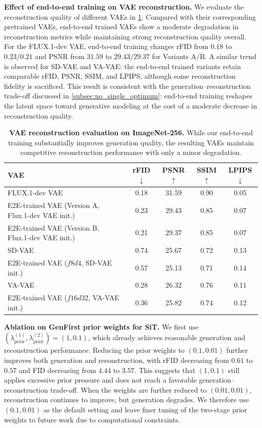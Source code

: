 \textbf{Effect of end-to-end training on VAE reconstruction.}
We evaluate the reconstruction quality of different VAEs in \cref{tab:vae_reconstruction}.
Compared with their corresponding pretrained VAEs, end-to-end trained VAEs show a moderate degradation in reconstruction metrics while maintaining strong reconstruction quality overall.
For the FLUX.1-dev VAE, end-to-end training changes rFID from $0.18$ to $0.23/0.21$ and PSNR from $31.59$ to $29.43/29.37$ for Variants A/B.
A similar trend is observed for SD-VAE and VA-VAE: the end-to-end trained variants retain comparable rFID, PSNR, SSIM, and LPIPS, although some reconstruction fidelity is sacrificed.
This result is consistent with the generation--reconstruction trade-off discussed in \cref{subsec:no_single_optimum}: end-to-end training reshapes the latent space toward generative modeling at the cost of a moderate decrease in reconstruction quality.

\begin{table}[t]
\centering
\scriptsize
\caption{
\textbf{VAE reconstruction evaluation on ImageNet-256.}
While our end-to-end training substantially improves generation quality, the resulting VAEs maintain competitive reconstruction performance with only a minor degradation.
}
\label{tab:vae_reconstruction}
\setlength{\tabcolsep}{5.0pt}

\begin{tabular}{lcccc}
\toprule
VAE
& rFID$\downarrow$
& PSNR$\uparrow$
& SSIM$\uparrow$
& LPIPS$\downarrow$ \\
\midrule
FLUX.1-dev VAE~\cite{flux1}
& 0.18
& 31.59
& 0.90
& 0.05 \\
E2E-trained VAE (Version A, Flux.1-dev VAE init.)
& 0.23
& 29.43
& 0.85
& 0.07 \\
E2E-trained VAE (Version B, Flux.1-dev VAE init.)
& 0.21
& 29.37
& 0.85
& 0.07 \\
\midrule
SD-VAE~\cite{ldm}
& 0.74
& 25.67
& 0.72
& 0.13 \\
E2E-trained VAE ($f8d4$, SD-VAE init.)
& 0.57
& 25.13
& 0.71
& 0.14 \\
\midrule
VA-VAE~\cite{vavae}
& 0.28
& 26.32
& 0.76
& 0.11 \\
E2E-trained VAE ($f16d32$, VA-VAE init.)
& 0.36
& 25.82
& 0.74
& 0.12 \\
\bottomrule
\end{tabular}
\end{table}

\textbf{Ablation on GenFirst prior weights for SiT.}
We first use $(\lambda_{\mathrm{prior}}^{(1)},\lambda_{\mathrm{prior}}^{(2)})=(1,0.1)$, which already achieves reasonable generation and reconstruction performance.
Reducing the prior weights to $(0.1,0.01)$ further improves both generation and reconstruction, with rFID decreasing from $0.61$ to $0.57$ and FID decreasing from $4.44$ to $3.57$.
This suggests that $(1,0.1)$ still applies excessive prior pressure and does not reach a favorable generation--reconstruction trade-off.
When the weights are further reduced to $(0.01,0.01)$, reconstruction continues to improve, but generation degrades.
We therefore use $(0.1,0.01)$ as the default setting and leave finer tuning of the two-stage prior weights to future work due to computational constraints.

